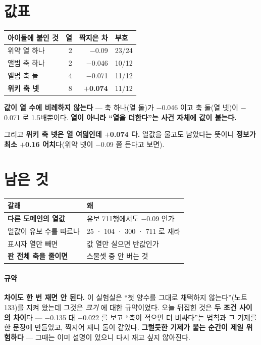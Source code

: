 \documentclass[10pt]{article}
\begin{document}
\section{값표}

\begin{center}\footnotesize
\begin{tabular}{lrrl}
\hline
아이돌에 붙인 것 & 열 & 짝지은 차 & 부호 \\
\hline
위약 열 하나 & 2 & $-$0.09 & 23/24 \\
앨범 축 하나 & 2 & $-$0.046 & 10/12 \\
앨범 축 둘 & 4 & $-$0.071 & 11/12 \\
\textbf{위키 축 넷} & 8 & \textbf{$+$0.074} & 11/12 \\
\hline
\end{tabular}
\end{center}

\textbf{값이 열 수에 비례하지 않는다} --- 축 하나(열 둘)가 $-$0.046 이고
축 둘(열 넷)이 $-$0.071 로 1.5배뿐이다. \textbf{열이 아니라 ``열을 더한다''는
사건 자체에 값이 붙는다.}

그리고 \textbf{위키 축 넷은 열 여덟인데 $+$0.074 다.} 열값을 물고도
남았다는 뜻이니 \textbf{정보가 최소 $+$0.16 어치}다(위약 넷이 $-$0.09 쯤
든다고 보면).

\section{남은 것}
\begin{center}\footnotesize
\begin{tabular}{ll}
\hline
갈래 & 왜 \\
\hline
\textbf{다른 도메인의 열값} & 유보 711행에서도 $-$0.09 인가 \\
열값이 유보 수를 따르나 & 25 · 104 · 300 · 711 로 재라 \\
표시자 열만 빼면 & 값 열만 실으면 반값인가 \\
\textbf{판 전체 축을 줄이면} & 스물셋 중 안 버는 것 \\
\hline
\end{tabular}
\end{center}

\paragraph{규약} \textbf{차이도 한 번 재면 안 된다.} 이 실험실은 ``첫
양수를 그대로 채택하지 않는다''(노트 133)를 지켜 왔는데 그것은 \emph{크기}
에 대한 규약이었다. 오늘 뒤집힌 것은 \textbf{두 조건 사이의 차이}다 ---
$-$0.135 대 $-$0.022 를 보고 ``축이 적으면 더 비싸다''는 법칙과 그 기제를
한 문장에 만들었고, 짝지어 재니 둘이 같았다. \textbf{그럴듯한 기제가
붙는 순간이 제일 위험하다} --- 그때는 이미 설명이 있으니 다시 재고 싶지
않아진다.
\end{document}
